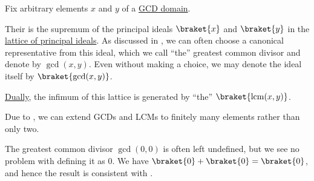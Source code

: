 \begin{definition}\label{def:gcd_and_lcm}\mimprovised
  Fix arbitrary elements \( x \) and \( y \) of a \hyperref[def:gcd_domain]{GCD domain}.

  Their  is the supremum of the principal ideals \( \braket{ x } \) and \( \braket{ y } \) in the \hyperref[rem:lattice_of_principal_ideals]{lattice of principal ideals}. As discussed in , we can often choose a canonical representative from this ideal, which we call \enquote{the} greatest common divisor and denote by \( \gcd(x, y) \). Even without making a choice, we may denote the ideal itself by \( \braket{ \gcd(x, y) } \).

  \hyperref[def:semilattice/duality]{Dually}, the infimum of this lattice is generated by \enquote{the}  \( \braket{ \lcm(x, y) } \).

  Due to , we can extend GCDs and LCMs to finitely many elements rather than only two.
\end{definition}

\begin{remark}\label{rem:gcd_of_zeros}
  The greatest common divisor \( \gcd(0, 0) \) is often left undefined, but we see no problem with defining it as \( 0 \). We have \( \braket{ 0 } + \braket{ 0 } = \braket{ 0 } \), and hence the result is consistent with .
\end{remark}

